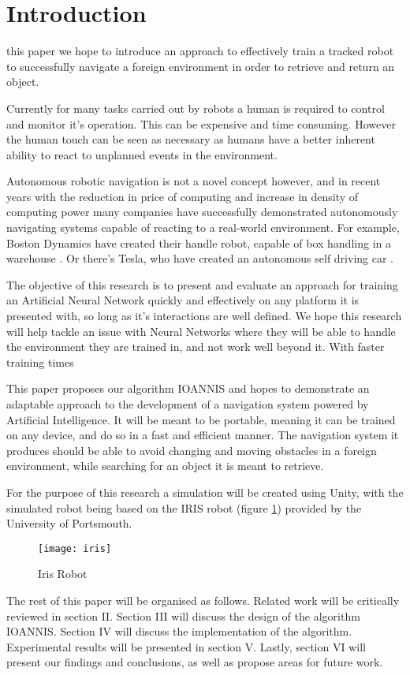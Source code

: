 \section{Introduction}
 this paper we hope to introduce an approach to effectively train a tracked robot to successfully navigate a foreign environment in order to retrieve and return an object. 

Currently for many tasks carried out by robots a human is required to control and monitor it's operation. This can be expensive and time consuming. However the human touch can be seen as necessary as humans have a better inherent ability to react to unplanned events in the environment.

Autonomous robotic navigation is not a novel concept however, and in recent years with the reduction in price of computing and increase in density of computing power many companies have successfully demonstrated autonomously navigating systems capable of reacting to a real-world environment. For example, Boston Dynamics have created their handle robot, capable of box handling in a warehouse \cite{BostonDynamics}. Or there's Tesla, who have created an autonomous self driving car \cite{Tesla}. 

The objective of this research is to present and evaluate an approach for training an Artificial Neural Network quickly and effectively on any platform it is presented with, so long as it's interactions are well defined. We hope this research will help tackle an issue with Neural Networks where they will be able to handle the environment they are trained in, and not work well beyond it. With faster training times 

This paper proposes our algorithm IOANNIS and hopes to demonstrate an adaptable approach to the development of a navigation system powered by Artificial Intelligence. It will be meant to be portable, meaning it can be trained on any device, and do so in a fast and efficient manner. The navigation system it produces should be able to avoid changing and moving obstacles in a foreign environment, while searching for an object it is meant to retrieve.

For the purpose of this research a simulation will be created using Unity, with the simulated robot being based on the IRIS robot (figure \ref{fig:irisImage}) provided by the University of Portsmouth.

\begin{figure}[h]
	\begin{center}
		\texttt{[image: iris]}
		\caption{Iris Robot}
		\label{fig:irisImage}
	\end{center}
\end{figure}

The rest of this paper will be organised as follows. Related work will be critically reviewed in section II. Section III will discuss the design of the algorithm IOANNIS. Section IV will discuss the implementation of the algorithm. Experimental results will be presented in section V. Lastly, section VI will present our findings and conclusions, as well as propose areas for future work.